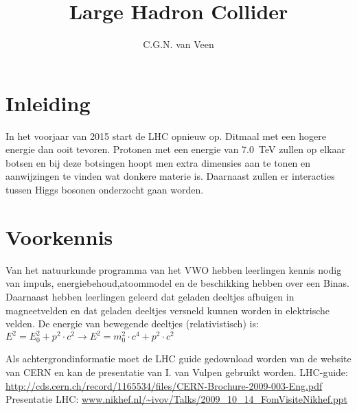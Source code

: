 

\usepackage{hepnames} 
\usepackage[version=3]{mhchem}
\usepackage{lipsum}
\usepackage{pgfplots}
\usepackage{amsmath}
\usepackage{tikz}
\usetikzlibrary{shapes}
\usetikzlibrary{positioning,arrows}
\usetikzlibrary{decorations.pathmorphing}
\usetikzlibrary{decorations.markings}


\DeclareRobustCommand{\PgDpp}{\HepParticle{\Delta}{}{++}\xspace}

\title{Large Hadron Collider} 
\author{C.G.N. van Veen}



\maketitle

\section{Inleiding} In het voorjaar van 2015 start de LHC opnieuw op. Ditmaal 
met een hogere energie dan ooit tevoren. Protonen met een energie van \SI{7.0}{\tera\electronvolt}
zullen op elkaar botsen en bij deze botsingen hoopt men extra dimensies aan te tonen en 
aanwijzingen te vinden wat donkere materie is. Daarnaast zullen er interacties tussen Higgs bosonen 
onderzocht gaan worden.

\section{Voorkennis}

Van het natuurkunde programma van het VWO hebben leerlingen kennis nodig van impuls, 
energiebehoud,atoommodel en de beschikking hebben over een Binas.
Daarnaast hebben leerlingen geleerd dat geladen deeltjes afbuigen in magneetvelden en dat 
geladen deeltjes versneld kunnen worden in elektrische velden.
De energie van bewegende deeltjes (relativistisch) is:\\
$E^2 = E_0^2 + p^2 \cdot c^2 \rightarrow  E^2 = m_0^2 \cdot c^4 + p^2 \cdot c^2 $

Als achtergrondinformatie moet de LHC guide gedownload worden van de 
website van CERN en kan de presentatie van I. van Vulpen gebruikt worden. 
LHC-guide: \url{http://cds.cern.ch/record/1165534/files/CERN-Brochure-2009-003-Eng.pdf}
Presentatie LHC: \url{www.nikhef.nl/~ivov/Talks/2009_10_14_FomVisiteNikhef.ppt}

